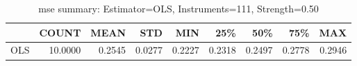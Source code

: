 \begin{table}[ht]
\centering
\caption{mse summary: Estimator=OLS, Instruments=111, Strength=0.50}
\begin{tabular}{lrrrrrrrr}
\toprule
 & COUNT & MEAN & STD & MIN & 25\% & 50\% & 75\% & MAX \\
\midrule
OLS & 10.0000 & 0.2545 & 0.0277 & 0.2227 & 0.2318 & 0.2497 & 0.2778 & 0.2946 \\
\bottomrule
\end{tabular}
\end{table}
